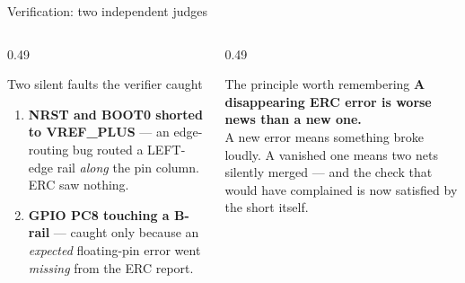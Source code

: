 \documentclass[aspectratio=169,10pt]{beamer}
\begin{document}
\begin{frame}{Verification: two independent judges}
\vspace{1mm}
\begin{center}
\end{center}
\vspace{1mm}
\begin{columns}[T]
\begin{column}{0.49\textwidth}
\begin{block}{Two silent faults the verifier caught}
\small
\begin{enumerate}
  \item \textbf{NRST and BOOT0 shorted to VREF\_PLUS} --- an edge-routing bug routed a LEFT-edge rail \emph{along} the pin column. ERC saw nothing.
  \item \textbf{GPIO PC8 touching a B-rail} --- caught only because an \emph{expected} floating-pin error went \emph{missing} from the ERC report.
\end{enumerate}
\end{block}
\end{column}
\begin{column}{0.49\textwidth}
\begin{block}{The principle worth remembering}
\small
\textbf{A disappearing ERC error is worse news than a new one.}\\[4pt]
A new error means something broke loudly. A vanished one means two nets silently merged --- and the check that would have complained is now satisfied by the short itself.
\end{block}
\end{column}
\end{columns}
\end{frame}
\end{document}
